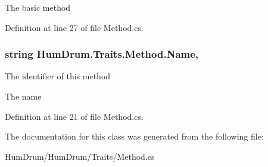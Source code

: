 The basic method

Definition at line 27 of file Method.\+cs.

\hypertarget{classHumDrum_1_1Traits_1_1Method_a2ae0ff4da65edaa5aa29dc57a876ffab}{}
\subsubsection[{Name}]{\setlength{\rightskip}{0pt plus 5cm}string Hum\+Drum.\+Traits.\+Method.\+Name\hspace{0.3cm}{\ttfamily [get]}, {\ttfamily [set]}}\label{classHumDrum_1_1Traits_1_1Method_a2ae0ff4da65edaa5aa29dc57a876ffab}


The identifier of this method 

The name

Definition at line 21 of file Method.\+cs.



The documentation for this class was generated from the following file\+:\begin{DoxyCompactItemize}
\item 
Hum\+Drum/\+Hum\+Drum/\+Traits/Method.\+cs\end{DoxyCompactItemize}

